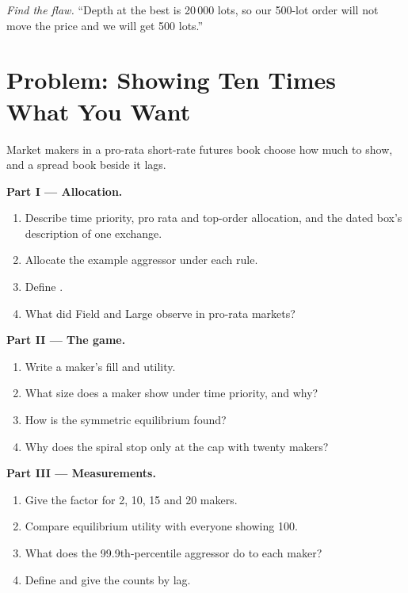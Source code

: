\begin{exercise}[$\star\star\star$]\label{exo:hf:futures-market-making:8}
\emph{Find the flaw.} ``Depth at the best is 20\,000 lots, so our 500-lot order will not move the price and we will get 500 lots.''
\end{exercise}

\section{Problem: Showing Ten Times What You Want}

\begin{problem}\label{pb:hf:futures-market-making:1}
Market makers in a pro-rata short-rate futures book choose how much to show, and a spread book beside it lags.

\medskip\noindent\textbf{Part I --- Allocation.}
\begin{enumerate}
\item Describe time priority, pro rata and top-order allocation, and the dated box's description of one exchange.
\item Allocate the example aggressor under each rule.
\item Define .
\item What did Field and Large observe in pro-rata markets?
\end{enumerate}

\medskip\noindent\textbf{Part II --- The game.}
\begin{enumerate}[resume]
\item Write a maker's fill and utility.
\item What size does a maker show under time priority, and why?
\item How is the symmetric equilibrium found?
\item Why does the spiral stop only at the cap with twenty makers?
\end{enumerate}

\medskip\noindent\textbf{Part III --- Measurements.}
\begin{enumerate}[resume]
\item Give the  factor for 2, 10, 15 and 20 makers.
\item Compare equilibrium utility with everyone showing 100.
\item What does the 99.9th-percentile aggressor do to each maker?
\item Define  and give the counts by lag.
\end{enumerate}


\end{problem}

